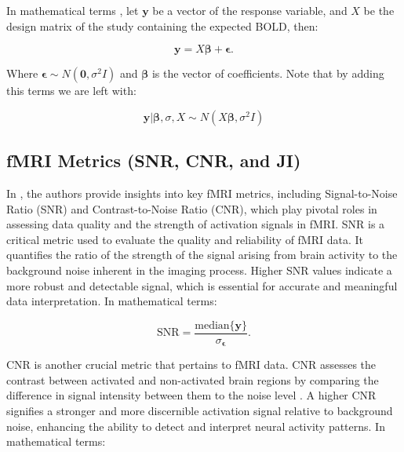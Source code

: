 In mathematical terms \cite{lindquist2008statistical}, let $\bm{y}$ be a vector of the response variable, and $X$ be the design matrix of the study containing the expected BOLD, then:

\begin{equation}
\bm{y} = X \bm{\beta} + \bm{\epsilon}.
\label{eq:linearRegression}
\end{equation}

Where $\bm{\epsilon} \sim N \left(\bm{0},\sigma^2 I\right)$ and $\bm{\beta}$ is the vector of coefficients. Note that by adding this terms we are left with:

\begin{equation}
\bm{y}|\bm{\beta}, \sigma, X \sim N \left(X \bm{\beta},\sigma^2 I\right)
\label{eq:boldDistribution}
\end{equation}

\subsection{fMRI Metrics (SNR, CNR, and JI)}

In \cite{welvaert2013definition}, the authors provide insights into key fMRI metrics, including Signal-to-Noise Ratio (SNR) and Contrast-to-Noise Ratio (CNR), which play pivotal roles in assessing data quality and the strength of activation signals in fMRI. SNR is a critical metric used to evaluate the quality and reliability of fMRI data. It quantifies the ratio of the strength of the signal arising from brain activity to the background noise inherent in the imaging process. Higher SNR values indicate a more robust and detectable signal, which is essential for accurate and meaningful data interpretation. In mathematical terms:

\begin{equation}
\text{SNR} = \frac{\text{median}\{\bm{y}\}}{\sigma_{\bm{\epsilon}}}.
\label{eq:SNRDef}
\end{equation}

CNR is another crucial metric that pertains to fMRI data. CNR assesses the contrast between activated and non-activated brain regions by comparing the difference in signal intensity between them to the noise level \cite{welvaert2013definition}. A higher CNR signifies a stronger and more discernible activation signal relative to background noise, enhancing the ability to detect and interpret neural activity patterns. In mathematical terms:

